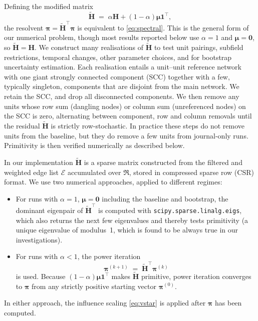Defining the modified matrix
\begin{equation}
	\mathbf{\tilde{H}}
	\;=\;
	\alpha\mathbf{H}+(1-\alpha)\boldsymbol{\mu}\mathbf{1}^\top,
	\label{eq:Hstar}
\end{equation}
the resolvent
$\boldsymbol{\pi}=\mathbf{\tilde{H}}^{\top}\boldsymbol{\pi}$
is equivalent to \eqref{eq:spectral}. This is the general form of
our numerical problem, though most results reported below use $\alpha=1$ and $\boldsymbol{\mu}=\mathbf{0}$, so $\mathbf{\tilde{H}}=\mathbf{H}$.
We construct many realisations of $\mathbf{\tilde{H}}$ to test unit pairings, subfield restrictions, temporal changes, other parameter choices, and for bootstrap uncertainty estimation. Each realisation entails a unit--unit reference network with one giant strongly connected component (SCC) together with a few, typically singleton, components that are disjoint from the main network. We retain the SCC, and drop all disconnected components. We then remove any units whose row sum (dangling nodes) or column sum (unreferenced nodes) on the SCC is zero, alternating between component, row and column removals until the residual $\mathbf{\tilde{H}}$ is strictly row-stochastic. In practice these steps do not remove units from the baseline, but they do remove a few units from journal-only runs. Primitivity is then verified numerically as described below.

In our implementation $\mathbf{\tilde{H}}$ is a sparse matrix constructed from the filtered and weighted edge list $\mathcal{E}$ accumulated over $\mathfrak{R}$, stored in compressed sparse row (CSR) format. We use two numerical approaches, applied to different regimes:
\begin{itemize}
	\setlength{\itemsep}{0pt}
	\item For runs with $\alpha=1$, $\boldsymbol{\mu}=\mathbf{0}$ including the baseline and bootstrap, the dominant eigenpair of $\mathbf{\tilde{H}}^\top$ is computed with \texttt{scipy.sparse.linalg.eigs}, which also returns the next few eigenvalues and thereby tests primitivity (a unique eigenvalue of modulus~1, which is found to be always true in our investigations).
	\item For runs with $\alpha<1$, the power iteration
		\begin{equation}
			\boldsymbol{\pi}^{(k+1)}
			\;=\;
			\mathbf{\tilde{H}}^{\top}\boldsymbol{\pi}^{(k)}
			\label{eq:power}
		\end{equation}
is used. Because $(1-\alpha)\boldsymbol{\mu}\mathbf{1}^\top$ makes $\mathbf{\tilde{H}}$ primitive, power iteration converges to $\boldsymbol{\pi}$ from any strictly positive starting vector $\boldsymbol{\pi}^{(0)}$.
\end{itemize}
In either approach, the influence scaling \eqref{eq:vstar} is applied after $\boldsymbol{\pi}$ has been computed.

